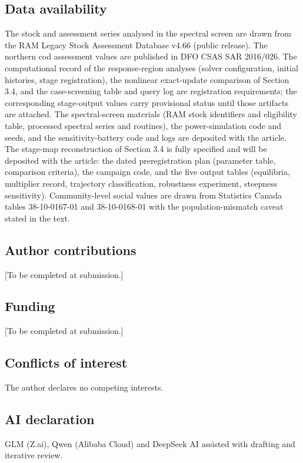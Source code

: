 \documentclass[11pt]{article}
\begin{document}
\subsection*{Data availability}

The stock and assessment series analysed in the spectral screen are
drawn from the RAM Legacy Stock Assessment Database v4.66 (public
release). The northern cod assessment values are published in DFO CSAS
SAR 2016/026. The computational record of the response-region analyses
(solver configuration, initial histories, stage registration), the
nonlinear exact-update comparison of Section 3.4, and the case-screening
table and query log are registration requirements; the
corresponding stage-output values carry provisional status until those
artifacts are attached. The spectral-screen materials (RAM stock identifiers
and eligibility table, processed spectral series and routines), the
power-simulation code and seeds, and the sensitivity-battery code and
logs are deposited with the article. The stage-map reconstruction of Section 3.4 is
fully specified and will be deposited with the article: the dated
preregistration plan (parameter table, comparison criteria), the
campaign code, and the five output tables (equilibria, multiplier
record, trajectory classification, robustness experiment, steepness
sensitivity). Community-level social values are drawn from Statistics
Canada tables 38-10-0167-01 and 38-10-0168-01 with the
population-mismatch caveat stated in the text.

\subsection*{Author contributions}

{[}To be completed at submission.{]}

\subsection*{Funding}

{[}To be completed at submission.{]}

\subsection*{Conflicts of interest}

The author declares no competing interests.

\subsection*{AI declaration}
GLM (Z.ai), Qwen (Alibaba Cloud) and DeepSeek AI assisted with drafting and iterative review.
\end{document}
